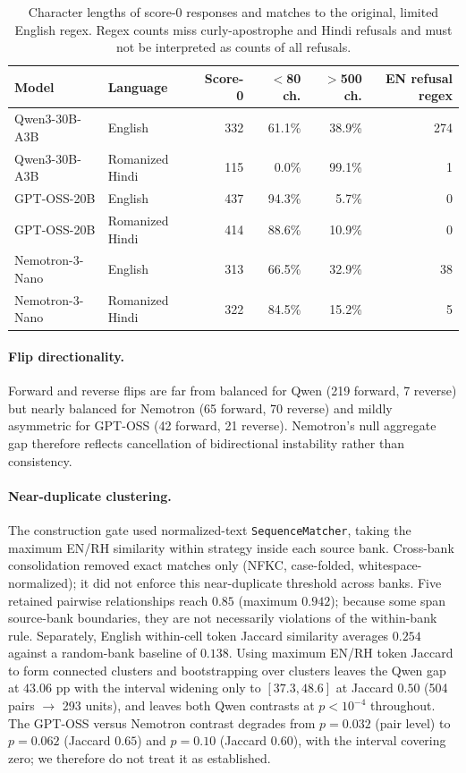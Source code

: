 \documentclass{article}
\begin{document}
\begin{table}[h]
\centering
\caption{Character lengths of score-0 responses and matches to the original, limited
English regex. Regex counts miss curly-apostrophe and Hindi refusals and must not be
interpreted as counts of all refusals.}
\label{tab:profile}
\small
\begin{tabular}{llrrrr}
\toprule
Model & Language & Score-0 & $<$80 ch. & $>$500 ch. & EN refusal regex \\
\midrule
Qwen3-30B-A3B & English & 332 & 61.1\% & 38.9\% & 274 \\
Qwen3-30B-A3B & Romanized Hindi & 115 & 0.0\% & 99.1\% & 1 \\
GPT-OSS-20B & English & 437 & 94.3\% & 5.7\% & 0 \\
GPT-OSS-20B & Romanized Hindi & 414 & 88.6\% & 10.9\% & 0 \\
Nemotron-3-Nano & English & 313 & 66.5\% & 32.9\% & 38 \\
Nemotron-3-Nano & Romanized Hindi & 322 & 84.5\% & 15.2\% & 5 \\
\bottomrule
\end{tabular}
\end{table}

\paragraph{Flip directionality.} Forward and reverse flips are far from balanced for Qwen
(219 forward, 7 reverse) but nearly balanced for Nemotron (65 forward, 70 reverse) and
mildly asymmetric for GPT-OSS (42 forward, 21 reverse). Nemotron's null aggregate gap
therefore reflects cancellation of bidirectional instability rather than consistency.

\paragraph{Near-duplicate clustering.} The construction gate used normalized-text
\texttt{SequenceMatcher}, taking the maximum EN/RH similarity within strategy inside
each source bank. Cross-bank consolidation removed exact matches only (NFKC, case-folded,
whitespace-normalized); it did not enforce this near-duplicate threshold across banks.
Five retained pairwise relationships reach $0.85$ (maximum $0.942$); because some span
source-bank boundaries, they are not necessarily violations of the within-bank rule.
Separately, English within-cell token Jaccard
similarity averages $0.254$ against a random-bank baseline of $0.138$.
Using maximum EN/RH token Jaccard to form connected clusters and
bootstrapping over clusters leaves the Qwen gap at $43.06$ pp with the interval widening
only to $[37.3, 48.6]$ at Jaccard $0.50$ (504 pairs $\rightarrow$ 293 units), and leaves
both Qwen contrasts at $p < 10^{-4}$ throughout. The GPT-OSS versus Nemotron contrast
degrades from $p = 0.032$ (pair level) to $p = 0.062$ (Jaccard $0.65$) and $p = 0.10$
(Jaccard $0.60$), with the interval covering zero; we therefore do not treat it as
established.
\end{document}
